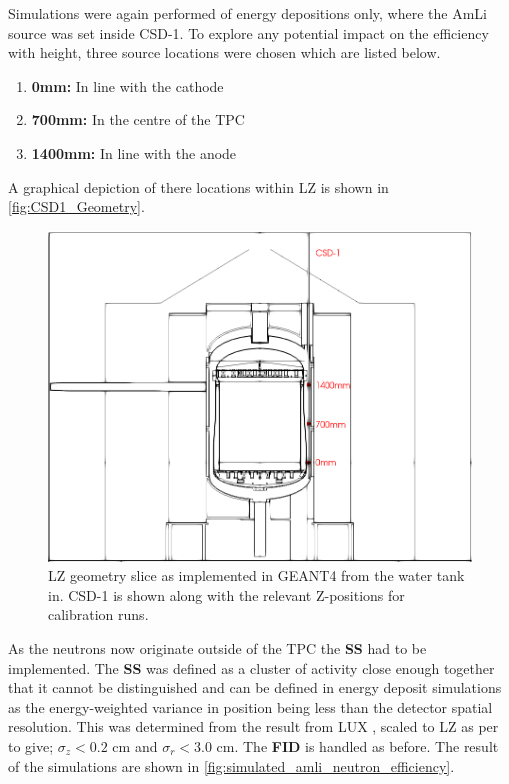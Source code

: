

\par
Simulations were again performed of energy depositions only, where the AmLi source was set inside CSD-1.
To explore any potential impact on the efficiency with height, three source locations were chosen which are listed below.
\begin{enumerate}
    \item \textbf{0mm:} In line with the cathode
    \item \textbf{700mm:} In the centre of the TPC
    \item \textbf{1400mm:} In line with the anode
\end{enumerate}
A graphical depiction of there locations within LZ is shown in \autoref{fig:CSD1_Geometry}. 

\begin{figure}[]
\centering
\includegraphics[width=\textwidth]{Figures/Geometry/csd1_geometry_black_and_white.png}
\caption{LZ geometry slice as implemented in GEANT4 from the water tank in. CSD-1 is shown along with the relevant Z-positions for calibration runs.}
\label{fig:CSD1_Geometry}
\end{figure}


\par
As the neutrons now originate outside of the TPC the \textbf{SS} had to be implemented.
The \textbf{SS} was defined as a cluster of activity close enough together that it cannot be distinguished and can be defined in energy deposit simulations as the energy-weighted variance in position being less than the detector spatial resolution.
This was determined from the result from LUX \cite{lux_position_reconstruction_ref}, scaled to LZ as per \cite{LZ_TechnicalDesignReview_ref} to give; ${\sigma}_{z}<0.2$ cm and ${\sigma}_{r}<3.0$ cm.
The \textbf{FID} is handled as before.
The result of the simulations are shown in \autoref{fig:simulated_amli_neutron_efficiency}.



